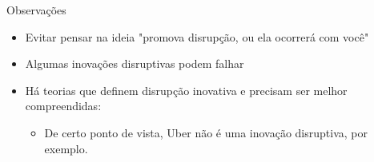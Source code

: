 \documentclass[t]{beamer}
\begin{document}
\begin{frame}{Observações}
	\begin{itemize}
		\item Evitar pensar na ideia "promova disrupção, ou ela ocorrerá com você"
		\item Algumas inovações disruptivas podem falhar
		\item Há teorias que definem disrupção inovativa e precisam ser melhor compreendidas:
		\begin{itemize}
			\item De certo ponto de vista, Uber não é uma inovação disruptiva, por exemplo.
		\end{itemize}
	\end{itemize}
\end{frame}


\frame{\titlepage}
\end{document}

